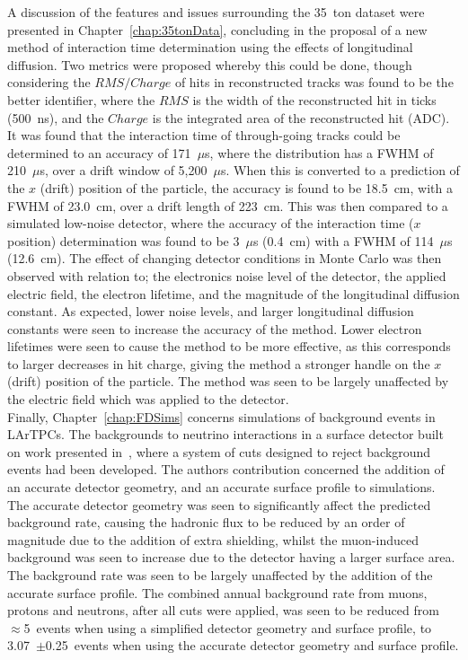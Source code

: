 A discussion of the features and issues surrounding the 35~ton dataset were presented in Chapter~\ref{chap:35tonData}, concluding in the proposal of a new method of interaction time determination using the effects of longitudinal diffusion. Two metrics were proposed whereby this could be done, though considering the $RMS/Charge$ of hits in reconstructed tracks was found to be the better identifier, where the $RMS$ is the width of the reconstructed hit in ticks (500~ns), and the $Charge$ is the integrated area of the reconstructed hit (ADC). It was found that the interaction time of through-going tracks could be determined to an accuracy of 171~$\mu$s, where the distribution has a FWHM of 210~$\mu$s, over a drift window of 5,200~$\mu$s. When this is converted to a prediction of the $x$ (drift) position of the particle, the accuracy is found to be 18.5~cm, with a FWHM of 23.0~cm, over a drift length of 223~cm. This was then compared to a simulated low-noise detector, where the accuracy of the interaction time ($x$ position) determination was found to be 3~$\mu$s (0.4~cm) with a FWHM of 114~$\mu$s (12.6~cm). The effect of changing detector conditions in Monte Carlo was then observed with relation to; the electronics noise level of the detector, the applied electric field, the electron lifetime, and the magnitude of the longitudinal diffusion constant. As expected, lower noise levels, and larger longitudinal diffusion constants were seen to increase the accuracy of the method. Lower electron lifetimes were seen to cause the method to be more effective, as this corresponds to larger decreases in hit charge, giving the method a stronger handle on the $x$ (drift) position of the particle. The method was seen to be largely unaffected by the electric field which was applied to the detector. \\

Finally, Chapter~\ref{chap:FDSims} concerns simulations of background events in LArTPCs. The backgrounds to neutrino interactions in a surface detector built on work presented in~\citep{MartinsThesis}, where a system of cuts designed to reject background events had been developed. The authors contribution concerned the addition of an accurate detector geometry, and an accurate surface profile to simulations. The accurate detector geometry was seen to significantly affect the predicted background rate, causing the hadronic flux to be reduced by an order of magnitude due to the addition of extra shielding, whilst the muon-induced background was seen to increase due to the detector having a larger surface area. The background rate was seen to be largely unaffected by the addition of the accurate surface profile. The combined annual background rate from muons, protons and neutrons, after all cuts were applied, was seen to be reduced from $\approx$5~events when using a simplified detector geometry and surface profile, to 3.07~$\pm$0.25~events when using the accurate detector geometry and surface profile. \\

